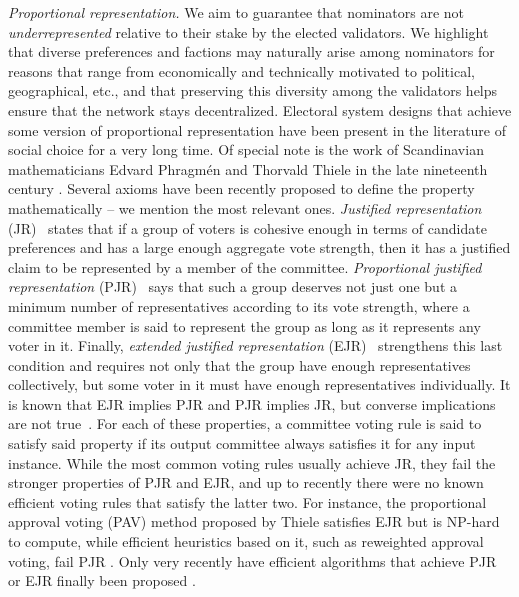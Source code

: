 \emph{Proportional representation.} We aim to guarantee that nominators are not \emph{underrepresented} relative to their stake by the elected validators. We highlight that diverse preferences and factions may naturally arise among nominators for reasons that range from economically and technically motivated to political, geographical, etc., and that preserving this diversity among the validators helps ensure that the network stays decentralized. 
Electoral system designs that achieve some version of proportional representation have been present in the literature of social choice for a very long time. Of special note is the work of Scandinavian mathematicians Edvard Phragm\'{e}n and Thorvald Thiele in the late nineteenth century \cite{phragmen1894methode, phragmen1895proportionella, phragmen1896theorie, phragmen1899till, thiele1895om, janson2016phragmen}. 
Several axioms have been recently proposed to define the property mathematically -- we mention the most relevant ones. 
\emph{Justified representation} (JR)~\cite{aziz2017justified} states that if a group of voters is cohesive enough in terms of candidate preferences and has a large enough aggregate vote strength, then it has a justified claim to be represented by a member of the committee.
\emph{Proportional justified representation} (PJR)~\cite{sanchez2017proportional} says that such a group deserves not just one but a minimum number of representatives according to its vote strength, where a committee member is said to represent the group as long as it represents any voter in it.
Finally, \emph{extended justified representation} (EJR)~\cite{aziz2017justified} strengthens this last condition and requires not only that the group have enough representatives collectively, but some voter in it must have enough representatives individually.
It is known that EJR implies PJR and PJR implies JR, but converse implications are not true~\cite{sanchez2017proportional}. %
For each of these properties, a committee voting rule is said to satisfy said property if its output committee always satisfies it for any input instance. 
While the most common voting rules usually achieve JR, they fail the stronger properties of PJR and EJR, and up to recently there were no known efficient voting rules that satisfy the latter two. 
For instance, the proportional approval voting (PAV) method \cite{thiele1895om, janson2016phragmen} proposed by Thiele satisfies EJR but is NP-hard to compute, while efficient heuristics based on it, such as reweighted approval voting, fail PJR \cite{aziz2014computational, skowron2016finding, aziz2017justified}. 
Only very recently have efficient algorithms that achieve PJR or EJR finally been proposed \cite{brill2017phragmen, sanchez2016maximin, aziz2018complexity, peters2019proportionality}. 

